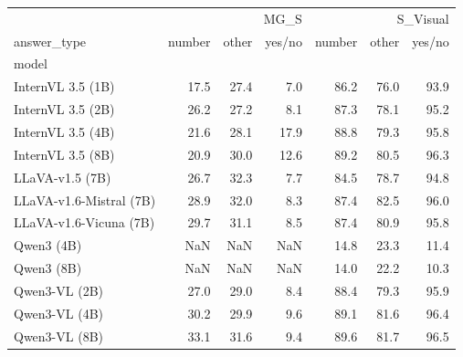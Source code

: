 \begin{tabular}{lrrrrrr}
\toprule
 & \multicolumn{3}{r}{MG_S} & \multicolumn{3}{r}{S_Visual} \\
answer_type & number & other & yes/no & number & other & yes/no \\
model &  &  &  &  &  &  \\
\midrule
InternVL 3.5 (1B) & 17.5 & 27.4 & 7.0 & 86.2 & 76.0 & 93.9 \\
InternVL 3.5 (2B) & 26.2 & 27.2 & 8.1 & 87.3 & 78.1 & 95.2 \\
InternVL 3.5 (4B) & 21.6 & 28.1 & 17.9 & 88.8 & 79.3 & 95.8 \\
InternVL 3.5 (8B) & 20.9 & 30.0 & 12.6 & 89.2 & 80.5 & 96.3 \\
LLaVA-v1.5 (7B) & 26.7 & 32.3 & 7.7 & 84.5 & 78.7 & 94.8 \\
LLaVA-v1.6-Mistral (7B) & 28.9 & 32.0 & 8.3 & 87.4 & 82.5 & 96.0 \\
LLaVA-v1.6-Vicuna (7B) & 29.7 & 31.1 & 8.5 & 87.4 & 80.9 & 95.8 \\
Qwen3 (4B) & NaN & NaN & NaN & 14.8 & 23.3 & 11.4 \\
Qwen3 (8B) & NaN & NaN & NaN & 14.0 & 22.2 & 10.3 \\
Qwen3-VL (2B) & 27.0 & 29.0 & 8.4 & 88.4 & 79.3 & 95.9 \\
Qwen3-VL (4B) & 30.2 & 29.9 & 9.6 & 89.1 & 81.6 & 96.4 \\
Qwen3-VL (8B) & 33.1 & 31.6 & 9.4 & 89.6 & 81.7 & 96.5 \\
\bottomrule
\end{tabular}
